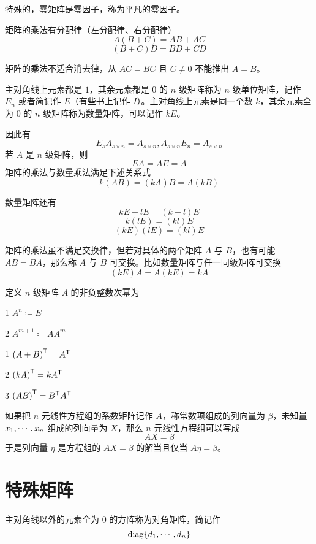 特殊的，零矩阵是零因子，称为平凡的零因子。

\begin{theorem}
    矩阵的乘法有分配律（左分配律、右分配律）
    \[A(B+C) = AB+AC\]
    \[(B+C)D = BD + CD\]
\end{theorem}

矩阵的乘法不适合消去律，从 $AC = BC$ 且 $C\ne 0$ 不能推出 $A=B$。

主对角线上元素都是 $1$，其余元素都是 $0$ 的 $n$ 级矩阵称为 $n$ 级单位矩阵，记作 $E_n$ 或者简记作 $E$（有些书上记作 $I$）。主对角线上元素是同一个数 $k$，其余元素全为 $0$ 的 $n$ 级矩阵称为数量矩阵，可以记作 $kE$。

因此有
\[E_s A_{s \times n} = A_{s \times n}, A_{s \times n} E_n= A_{s \times n}\]
若 $A$ 是 $n$ 级矩阵，则
\[EA = AE = A\]
矩阵的乘法与数量乘法满足下述关系式
\[k(AB) = (kA)B = A(kB)\]

数量矩阵还有
\[kE + lE = (k+l)E\]
\[k(lE) = (kl)E\]
\[(kE)(lE) = (kl)E\]

矩阵的乘法虽不满足交换律，但若对具体的两个矩阵 $A$ 与 $B$，也有可能 $AB = BA$，那么称 $A$ 与 $B$ 可交换。比如数量矩阵与任一同级矩阵可交换
\[(kE)A = A(kE) = kA\]

\begin{definition}
    定义 $n$ 级矩阵 $A$ 的非负整数次幂为

    \num{1} $A^n \coloneqq  E$

    \num{2} $A^{m+1} \coloneqq  AA^m$
\end{definition}


\begin{theorem}
    \num{1} ${(A+B)}^\mathsf{T} = {A}^\mathsf{T}$
    
    \num{2} ${(kA)}^\mathsf{T} = k{A}^\mathsf{T}$
    
    \num{3} ${(AB)}^\mathsf{T} = {B}^\mathsf{T}{A}^\mathsf{T}$
\end{theorem}

如果把 $n$ 元线性方程组的系数矩阵记作 $A$，称常数项组成的列向量为 $\beta$，未知量 $x_1,\cdots,x_n$ 组成的列向量为 $X$，那么 $n$ 元线性方程组可以写成
\[AX = \beta\]
于是列向量 $\eta$ 是方程组的 $AX = \beta$ 的解当且仅当 $A\eta = \beta$。

\section{特殊矩阵}

\begin{definition}
    主对角线以外的元素全为 $0$ 的方阵称为对角矩阵，简记作
    \[\operatorname{diag}\{d_1,\cdots,d_n\}\]
\end{definition}

